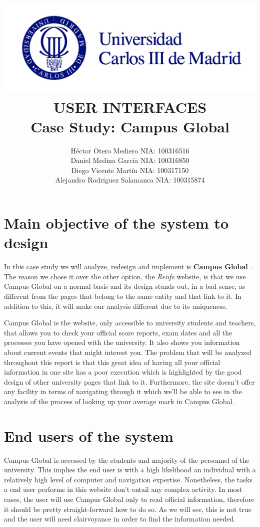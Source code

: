 \documentclass{article}
\title{ \includegraphics[width=15cm]{uc3m-logo.jpg} \\ \TitleFont USER INTERFACES \\ Case Study: Campus Global\vspace{7cm}}
\author{Héctor Otero Mediero NIA: 100316516 \\  Daniel Medina García NIA: 100316850 \\ Diego Vicente Martín NIA: 100317150 \\ Alejandro Rodríguez Salamanca NIA: 100315874}
\begin{document}
\begin{titlepage}
\end{titlepage}
\maketitle
\thispagestyle{empty}
\newpage
\doublespace
\tableofcontents
\thispagestyle{empty}
\newpage
\singlespace
\section{Main	objective	of	the	system	to	design}

In this case study we will analyze, redesign and implement is \textbf{Campus Global} . The reason we chose it over the other option, the {\it Renfe} website, is that we use Campus Global on a normal basis and its design stands out, in a bad sense, as different from the pages that belong to the same entity and that link to it. In addition to this, it will make our analysis different due to its uniqueness. 


Campus Global is the website, only accessible to university students and teachers, that allows you to check your official score reports, exam dates and all the processes you have opened with the university. It also shows you information about current events that might interest you. The problem that will be analyzed throughout this report is that this great idea of having all your official information in one site has a poor execution which is highlighted by the good design of other university pages that link to it. Furthermore, the site doesn't offer any facility in terms of navigating through it which we'll be able to see in the analysis of the process of looking up your average mark in Campus Global.

\section{End	users	of	the	system}

Campus Global is accessed by the students and majority of the personnel of the university. This implies the end user is with a high likelihood an individual with a relatively high level of computer and navigation expertise. Nonetheless, the tasks a end user performs in this website don't entail any complex activity. In most cases, the user will use Campus Global only to read official information, therefore it should be pretty straight-forward how to do so. As we will see, this is not true and the user will need clairvoyance in order to find the information needed.
\end{document}

